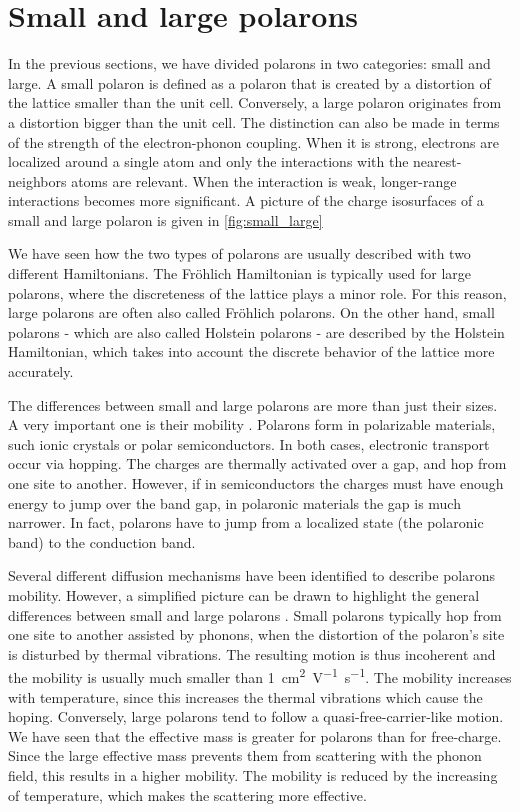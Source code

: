 \section{Small and large polarons}
In the previous sections, we have divided polarons in two categories: small and large. A small polaron is defined as a polaron that is created by a distortion of the lattice smaller than the unit cell. Conversely, a large polaron originates from a distortion bigger than the unit cell. The distinction can also be made in terms of the strength of the electron-phonon coupling. When it is strong, electrons are localized around a single atom and only the interactions with the nearest-neighbors atoms are relevant. When the interaction is weak, longer-range interactions becomes more significant. A picture of the charge isosurfaces of a small and large polaron is given in \cref{fig:small_large}

We have seen how the two types of polarons are usually described with two different Hamiltonians. The Fröhlich Hamiltonian is typically used for large polarons, where the discreteness of the lattice plays a minor role. For this reason, large polarons are often also called Fröhlich polarons. On the other hand, small polarons - which are also called Holstein polarons - are described by the Holstein Hamiltonian, which takes into account the discrete behavior of the lattice more accurately.

The differences between small and large polarons are more than just their sizes. A very important one is their mobility \cite{natanzon2020}. Polarons form in polarizable materials, such ionic crystals or polar semiconductors. In both cases, electronic transport occur via hopping. The charges are thermally activated over a gap, and hop from one site to another. However, if in semiconductors the charges must have enough energy to jump over the band gap, in polaronic materials the gap is much narrower. In fact, polarons have to jump from a localized state (the polaronic band) to the conduction band.

Several different diffusion mechanisms have been identified to describe polarons mobility. However, a simplified picture can be drawn to highlight the general differences between small and large polarons \cite{franchini2021b}. Small polarons typically hop from one site to another assisted by phonons, when the distortion of the polaron's site is disturbed by thermal vibrations. The resulting motion is thus incoherent and the mobility is usually much smaller than \SI{1}{cm^2 V^{-1}s^{-1}}. The mobility increases with temperature, since this increases the thermal vibrations which cause the hoping. Conversely, large polarons tend to follow a quasi-free-carrier-like motion. We have seen that the effective mass is greater for polarons than for free-charge. Since the large effective mass prevents them from scattering with the phonon field, this results in a higher mobility. The mobility is reduced by the increasing of temperature, which makes the scattering more effective.

